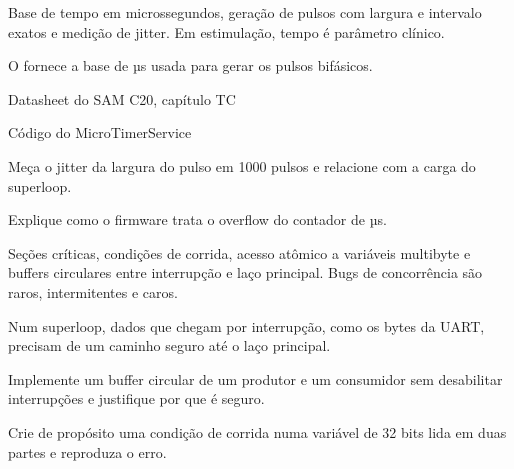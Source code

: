 Base de tempo em microssegundos, geração de pulsos com largura e intervalo exatos e medição de jitter. Em estimulação, tempo é parâmetro clínico.

\begin{noproduto}
O  fornece a base de µs usada para gerar os pulsos bifásicos.
\end{noproduto}

\begin{paraestudar}
  \item Datasheet do SAM C20, capítulo TC
  \item Código do MicroTimerService
\end{paraestudar}

\begin{pratique}
  \item Meça o jitter da largura do pulso em 1000 pulsos e relacione com a carga do superloop.
  \item Explique como o firmware trata o overflow do contador de µs.
\end{pratique}

Seções críticas, condições de corrida, acesso atômico a variáveis multibyte e buffers circulares entre interrupção e laço principal. Bugs de concorrência são raros, intermitentes e caros.

\begin{noproduto}
Num superloop, dados que chegam por interrupção, como os bytes da UART, precisam de um caminho seguro até o laço principal.
\end{noproduto}

\begin{paraestudar}
  \item {}
  \item {}
\end{paraestudar}

\begin{pratique}
  \item Implemente um buffer circular de um produtor e um consumidor sem desabilitar interrupções e justifique por que é seguro.
  \item Crie de propósito uma condição de corrida numa variável de 32 bits lida em duas partes e reproduza o erro.
\end{pratique}

